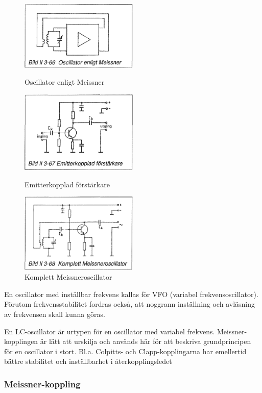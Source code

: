 \begin{figure}
  \includegraphics[width=0.5\textwidth]{images/bild_2_3-66}
  \caption{Oscillator enligt Meissner}
  \label{fig:BildII3-66}

  \includegraphics[width=0.5\textwidth]{images/bild_2_3-67}
  \caption{Emitterkopplad förstärkare}
  \label{fig:BildII3-67}

  \includegraphics[width=0.5\textwidth]{images/bild_2_3-68}
  \caption{Komplett Meissneroscillator}
  \label{fig:BildII3-68}
\end{figure}

En oscillator med inställbar frekvens kallas för VFO (variabel
frekvensoscillator). Förutom frekvensstabilitet fordras också, att
noggrann inställning och avläsning av frekvensen skall kunna göras.

En LC-oscillator är urtypen för en oscillator med variabel
frekvens. Meissner-kopplingen är lätt att urskilja och används här för
att beskriva grundprincipen för en oscillator i stort. Bl.a. Colpitts-
och Clapp-kopplingarna har emellertid bättre stabilitet och
inställbarhet i återkopplingsledet

\subsubsection{Meissner-koppling}

